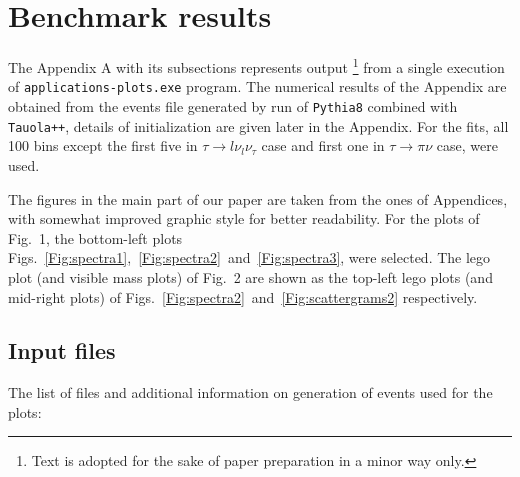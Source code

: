 \setcounter{figure}{0}

\renewcommand\thefigure{\thesection.\arabic{figure}}

\section{Benchmark results}\label{sec:OutputTest} 

The Appendix A with its subsections represents output%
\footnote{ Text is adopted for the sake of paper preparation in 
a minor way only.}
from a single execution of {\tt applications-plots.exe} program.
The numerical results of the Appendix  are obtained  
from the  events file  generated 
 by run of {\tt Pythia8} combined  with {\tt Tauola++}, details of initialization  
are given later in the Appendix. 
For the fits,  all 100 bins except 
the first five in $\tau \to l \nu_l \nu_\tau $ case  and first one in $\tau \to \pi \nu$ case, were used\footnotemark[18].


The figures in the main part of our 
paper are taken from the ones of Appendices, with somewhat improved graphic style 
for better readability. 
For the plots of Fig.~1,  the bottom-left plots 
 Figs.~\ref{Fig:spectra1},~\ref{Fig:spectra2}~and~\ref{Fig:spectra3}, were selected.
The lego plot (and visible mass plots) of Fig.~2 are shown as the top-left lego plots (and mid-right plots)
of Figs.~\ref{Fig:spectra2}~and~\ref{Fig:scattergrams2} respectively.




 
\subsection{Input files} \label{Sec:InputFiles}
The list of files and additional information on generation of events 
used for the plots: 
{\small {} }

\vspace{1\baselineskip}


